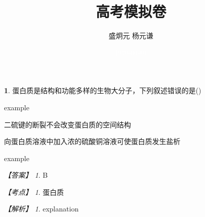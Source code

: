 \documentclass[UTF8, 10pt, a4paper, oneside]{ctexart}
\title{\vspace{-2em} 高考模拟卷 }
\author{盛炯元 \quad 杨元谦}
\date{\textcolor{white}{\today}\vspace{-3em}}
\theoremstyle{definition}
\newtheorem{exercise}{}
\theoremstyle{remark}
\newtheorem*{answer}{【答案】}
\newtheorem*{point}{【考点】}      %
\newtheorem*{explanation}{【解析】}     %
\theoremstyle{plain}
\begin{document}
\maketitle

\begin{exercise}
蛋白质是结构和功能多样的生物大分子，下列叙述错误的是\quad(\quad)
\begin{adjustwidth}{4em}{}
        \begin{asparaenum}[A. ]
            \item example
            \item 二硫键的断裂不会改变蛋白质的空间结构
            \item 向蛋白质溶液中加入浓的硫酸铜溶液可使蛋白质发生盐析
            \item example
        \end{asparaenum}
\end{adjustwidth}
\begin{answer}
    B
\end{answer}
\begin{point}
    蛋白质
\end{point}
\begin{explanation}
    explanation
\end{explanation}
\end{exercise}
\end{document}
